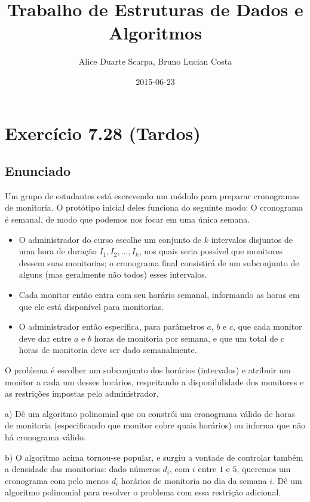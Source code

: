 \documentclass[11pt]{article}
\author{Alice Duarte Scarpa, Bruno Lucian Costa}
\date{2015-06-23}
\title{Trabalho de Estruturas de Dados e Algoritmos}
\begin{document}
\maketitle

\section{Exercício 7.28 (Tardos)}
\label{sec-1}

\subsection{Enunciado}
\label{sec-1-1}

Um grupo de estudantes está escrevendo um módulo para preparar
cronogramas de monitoria. O protótipo inicial deles funciona do
seguinte modo: O cronograma é semanal, de modo que podemos nos focar
em uma única semana.

\begin{itemize}
\item O administrador do curso escolhe um conjunto de $k$
intervalos disjuntos de uma hora de duração $I_1, I_2, \ldots,
      I_k$, nos quais seria possível que monitores dessem suas
monitorias; o cronograma final consistirá de um subconjunto de
alguns (mas geralmente não todos) esses intervalos.
\item Cada monitor então entra com seu horário semanal, informando
as horas em que ele está disponível para monitorias.
\item O administrador então especifica, para parâmetros $a$, $b$ e
$c$, que cada monitor deve dar entre $a$ e $b$ horas de
monitoria por semana, e que um total de $c$ horas de monitoria
deve ser dado semanalmente.
\end{itemize}

O problema é escolher um subconjunto dos horários (intervalos) e
atribuir um monitor a cada um desses horários, respeitando a
disponibilidade dos monitores e as restrições impostas pelo
administrador.


a) Dê um algoritmo polinomial que ou constrói um cronograma
   válido de horas de monitoria (especificando que monitor cobre
   quais horários) ou informa que não há cronograma válido.


b) O algoritmo acima tornou-se popular, e surgiu a vontade de
   controlar também a densidade das monitorias: dado números $d_i$,
   com $i$ entre $1$ e $5$, queremos um cronograma com pelo menos
   $d_i$ horários de monitoria no dia da semana $i$. Dê um
   algoritmo polinomial para resolver o problema com essa restrição
   adicional.
\end{document}
